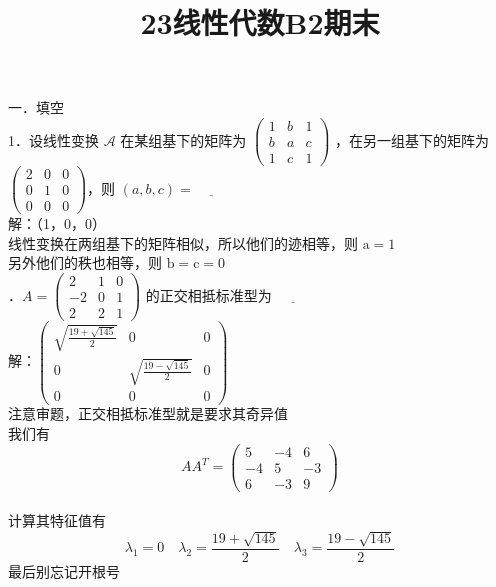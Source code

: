 \documentclass[UTF8]{ctexart}
\title{23线性代数B2期末}
\author{\calligra{NULIOUS}}
\date{}
\begin{document}
\maketitle
\noindent 一．填空\\
1．设线性变换 $\mathcal{A}$ 在某组基下的矩阵为 $\left(\begin{array}{lll}1 & b & 1 \\ b & a & c \\ 1 & c & 1\end{array}\right)$ ，在另一组基下的矩阵为 $\left(\begin{array}{lll}2 & 0 & 0 \\ 0 & 1 & 0 \\ 0 & 0 & 0\end{array}\right)$，则 $(a, b, c)=\underline{\hspace{1cm}}$\\
解：（1，0，0）\\
线性变换在两组基下的矩阵相似，所以他们的迹相等，则 $\mathrm{a}=1$\\
另外他们的秩也相等，则 $\mathrm{b}=\mathrm{c}=0$\\


．$A=\left(\begin{array}{ccc}2 & 1 & 0 \\ -2 & 0 & 1 \\ 2 & 2 & 1\end{array}\right)$ 的正交相抵标准型为 $\underline{\hspace{1cm}}$\\
解：$\left(\begin{array}{ccc}\sqrt{\frac{19+\sqrt{145}}{2}} & 0 & 0 \\ 0 & \sqrt{\frac{19-\sqrt{145}}{2}} & 0 \\ 0 & 0 & 0\end{array}\right)$\\
注意审题，正交相抵标准型就是要求其奇异值\\
我们有 
$$A A^{T}=\left(\begin{array}{ccc}5 & -4 & 6 \\ -4 & 5 & -3 \\ 6 & -3 & 9\end{array}\right)$$\\
计算其特征值有 
$$\lambda_{1}=0 \quad \lambda_{2}=\frac{19+\sqrt{145}}{2} \quad \lambda_{3}=\frac{19-\sqrt{145}}{2}$$
最后别忘记开根号\\
\end{document}
